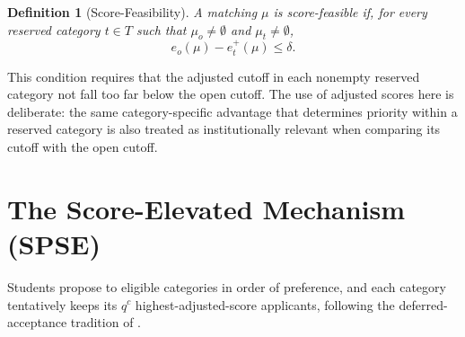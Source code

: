 \documentclass[10pt]{article}
\newtheorem{definition}{Definition}
\newcommand{\1}{\mathbf{1}}
\newcommand{\yao}[1]{{\color{blue}#1}}
\newcommand{\shimamura}[1]{{\color{red}#1}}
\begin{document}
\begin{definition}[Score-Feasibility]
A matching $\mu$ is score-feasible if, for every reserved category $t\in T$ such that $\mu_o\ne\emptyset$ and $\mu_t\ne\emptyset$,
\[
e_o(\mu)-e_t^+(\mu)\le \delta.
\]
\end{definition}

This condition requires that the adjusted cutoff in each nonempty reserved category not fall too far below the open cutoff. The use of adjusted scores here is deliberate: the same category-specific advantage that determines priority within a reserved category is also treated as institutionally relevant when comparing its cutoff with the open cutoff.






\section{The Score-Elevated Mechanism (SPSE)}

Students propose to eligible categories in order of preference, and each category tentatively keeps its $q^c$ highest-adjusted-score applicants, following the deferred-acceptance tradition of \citet{GaSh62a,Roth08a}.
\end{document}
